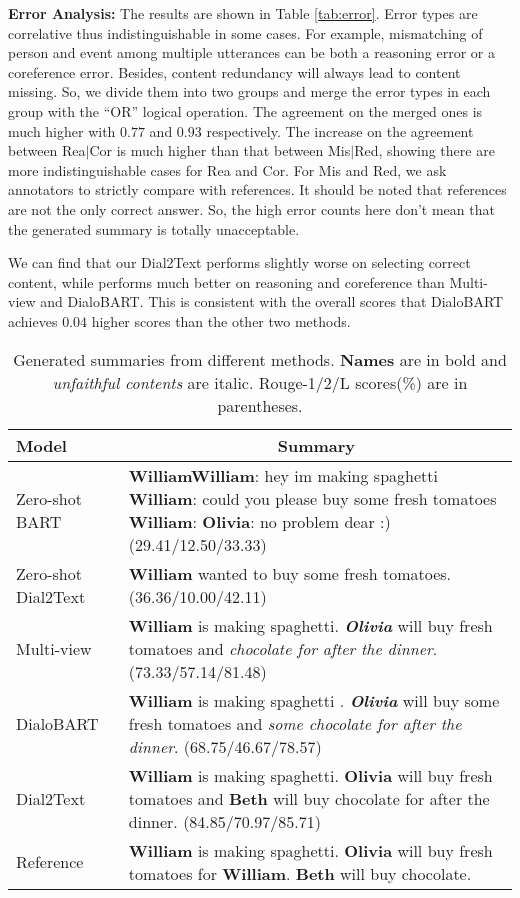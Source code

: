 \textbf{Error Analysis:} The results are shown in Table \ref{tab:error}. 
Error types are correlative thus indistinguishable in some cases. For example, 
mismatching of person and event among multiple utterances can be both 
a reasoning error or a coreference error. Besides, content redundancy will 
always lead to content missing. So, we divide them into two groups and 
merge the error types in each group with the ``OR'' logical operation. 
The agreement on the merged ones is much higher with $0.77$ and $0.93$ respectively. The increase on the agreement between Rea$\mid$Cor is much higher than that between Mis$\mid$Red, showing there are more indistinguishable cases for Rea and Cor. For Mis and Red, we ask annotators to strictly compare with references. It should be noted that references are not the only correct answer. So, the high error counts here don't mean that the generated summary is totally unacceptable.

We can find that our Dial2Text performs slightly worse on selecting correct content, while
performs much better on reasoning and coreference than Multi-view and DialoBART. This is consistent with the overall scores that DialoBART achieves $0.04$ higher scores than the other two methods.

\begin{table}
	\centering
	\small
	\begin{tabular}{p{1.3cm}p{6.3cm}}
		\toprule[1pt]
		\textbf{Model} & \multicolumn{1}{c}{\textbf{Summary}} \\
		\midrule[1pt]
		Zero-shot BART& \textbf{WilliamWilliam}: hey im making spaghetti \textbf{William}: could you please buy some fresh tomatoes \textbf{William}: \textbf{Olivia}: no problem dear :) (29.41/12.50/33.33)\\
		\hline
		Zero-shot Dial2Text& \textbf{William} wanted to buy some fresh tomatoes. (36.36/10.00/42.11)\\
		\midrule[1pt]
		Multi-view&\textbf{William} is making spaghetti. \textit{\textbf{Olivia}} will buy fresh tomatoes and \textit{chocolate for after the dinner}. (73.33/57.14/81.48)\\
		\hline
		DialoBART&\textbf{William} is making spaghetti . \textit{\textbf{Olivia}} will buy some fresh tomatoes and \textit{some chocolate for after the dinner}. (68.75/46.67/78.57)\\
		\hline
		Dial2Text&\textbf{William} is making spaghetti. \textbf{Olivia} will buy fresh tomatoes and \textbf{Beth} will buy chocolate for after the dinner. (84.85/70.97/85.71)\\		
		\hline
		Reference&\textbf{William} is making spaghetti. \textbf{Olivia} will buy fresh tomatoes for \textbf{William}. \textbf{Beth} will buy chocolate.\\
		\bottomrule[1pt]
	\end{tabular}
	
	\caption{Generated summaries from different methods. \textbf{Names} are in bold and \textit{unfaithful contents} are italic. Rouge-1/2/L scores(\%) are in parentheses.}
	\label{tab:example}  
\end{table}


